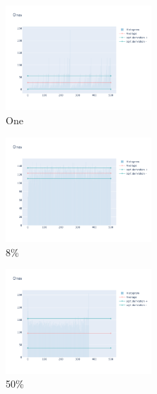 \documentclass[12pt, fleqn]{report}                             %
\theoremstyle{break}                                            %
\begin{document}
      \begin{figure}[ht!]
        \centering
        \begin{subfigure}[b]{0.4\linewidth}
          \includegraphics[width=0.6\textwidth]{Images/146/dia-a.png}
          \caption{One}
        \end{subfigure}
        \begin{subfigure}[b]{0.4\linewidth}
          \includegraphics[width=0.6\textwidth]{Images/146/dia-b.png}
          \caption{8\%}
        \end{subfigure}
        \begin{subfigure}[b]{0.4\linewidth}
          \includegraphics[width=0.6\textwidth]{Images/146/dia-c.png}
          \caption{50\%}
        \end{subfigure}
        \begin{subfigure}[b]{0.4\linewidth}

\end{subfigure}
\end{figure}
\end{document}
